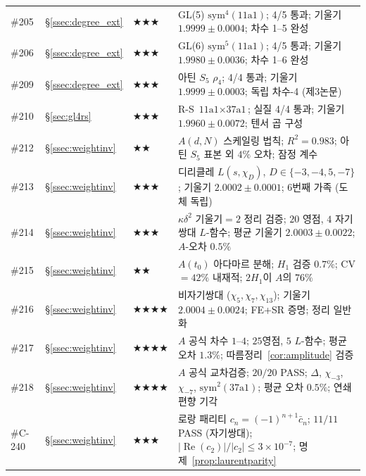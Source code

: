 \documentclass[11pt, a4paper]{article}
\theoremstyle{plain}
\theoremstyle{definition}
\begin{document}
\begin{longtable}{lllp{5.5cm}}
\#205 & \S\ref{ssec:degree_ext}   & \textbf{$\bigstar\bigstar\bigstar$}    & GL(5) $\mathrm{sym}^{4}(\text{11a1})$; 4/5 통과; 기울기 $\mathbf{1.9999\pm0.0004}$; 차수 1--5 완성 \\
\#206 & \S\ref{ssec:degree_ext}   & \textbf{$\bigstar\bigstar\bigstar$}    & GL(6) $\mathrm{sym}^{5}(\text{11a1})$; 4/5 통과; 기울기 $\mathbf{1.9980\pm0.0036}$; 차수 1--6 완성 \\
\#209 & \S\ref{ssec:degree_ext}   & \textbf{$\bigstar\bigstar\bigstar$}    & 아틴 $S_5$ $\rho_4$; 4/4 통과; 기울기 $\mathbf{1.9999\pm0.0003}$; 독립 차수-4 (제3논문) \\
\#210 & \S\ref{sec:gl4rs}         & \textbf{$\bigstar\bigstar\bigstar$}    & R-S $\text{11a1}\times\text{37a1}$; 실질 4/4 통과; 기울기 $\mathbf{1.9960\pm0.0072}$; 텐서 곱 구성 \\
\#212 & \S\ref{ssec:weightinv}    & \textbf{$\bigstar\bigstar$}           & $A(d,N)$ 스케일링 법칙; $R^{2}=0.983$; 아틴 $S_5$ 표본 외 $4\%$ 오차; 잠정 계수 \\
\#213 & \S\ref{ssec:weightinv}    & \textbf{$\bigstar\bigstar\bigstar$}    & 디리클레 $L(s,\chi_D)$, $D\in\{-3,-4,5,-7\}$; 기울기 $\mathbf{2.0002\pm0.0001}$; 6번째 가족 (도체 독립) \\
\#214 & \S\ref{ssec:weightinv}    & \textbf{$\bigstar\bigstar\bigstar$}    & $\kappa\delta^{2}$ 기울기${}{=}2$ 정리 검증; $20$ 영점, $4$ 자기쌍대 $L$-함수; 평균 기울기 $2.0003\pm0.0022$; $A$-오차 $0.5\%$ \\
\#215 & \S\ref{ssec:weightinv}    & \textbf{$\bigstar\bigstar$}           & $A(t_0)$ 아다마르 분해; $H_1$ 검증 $0.7\%$; CV$=42\%$ 내재적; $2H_1$이 $A$의 $76\%$ \\
\#216 & \S\ref{ssec:weightinv}    & \textbf{$\bigstar\bigstar\bigstar\bigstar$} & 비자기쌍대 ($\chi_5,\chi_7,\chi_{13}$); 기울기 $\mathbf{2.0004\pm0.0024}$; FE+SR 증명; 정리 일반화 \\
\#217 & \S\ref{ssec:weightinv}    & \textbf{$\bigstar\bigstar\bigstar\bigstar$} & $A$ 공식 차수 $1$--$4$; $25$영점, $5$ $L$-함수; 평균 오차 $1.3\%$; 따름정리~\ref{cor:amplitude} 검증 \\
\#218 & \S\ref{ssec:weightinv}    & \textbf{$\bigstar\bigstar\bigstar\bigstar$} & $A$ 공식 교차검증; $20/20$ PASS; $\Delta$, $\chi_{-3}$, $\chi_{-7}$, $\mathrm{sym}^{2}(\text{37a1})$; 평균 오차 $0.5\%$; 연쇄 편향 기각 \\
\#C-240 & \S\ref{ssec:weightinv} & \textbf{$\bigstar\bigstar\bigstar$} & 로랑 패리티 $c_n=(-1)^{n{+}1}\bar{c}_n$; $11/11$ PASS (자기쌍대); $|\!\operatorname{Re}(c_2)|/|c_2|\leq 3{\times}10^{-7}$; 명제~\ref{prop:laurentparity} \\

\end{longtable}
\end{document}

